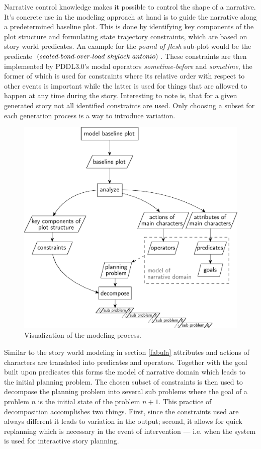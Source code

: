 Narrative control knowledge makes it possible to control the shape of a narrative. It's concrete use in the modeling approach at hand is to guide the narrative along a predetermined baseline plot. This is done by identifying key components of the plot structure and formulating state trajectory constraints, which are based on story world predicates. An example for the \emph{pound of flesh} sub-plot would be the predicate $(sealed\h bond\h over\h load\ shylock\ antonio)$. These constraints are then implemented by PDDL3.0's modal operators \emph{some\-time-before} and \emph{sometime}, the former of which is used for constraints where its relative order with respect to other events is important while the latter is used for things that are allowed to happen at any time during the story. Interesting to note is, that for a given generated story not all identified constraints are used. Only choosing a subset for each generation process is a way to introduce variation.
\begin{figure}[htbp]
 \centering
 \includegraphics[scale=0.6]{discourse_model}
 \caption{Visualization of the modeling process.}
 \label{fig:modproc}
\end{figure}

Similar to the story world modeling in section \ref{fabula} attributes and actions of characters are translated into predicates and operators. Together with the goal built upon predicates this forms the model of narrative domain which leads to the initial planning problem. The chosen subset of constraints is then used to decompose the planning problem into several sub problems where the goal of a problem $n$ is the initial state of the problem $n+1$. This practice of decomposition accomplishes two things. First, since the constraints used are always different it leads to variation in the output; second, it allows for quick replanning which is necessary in the event of intervention --- i.e. when the system is used for interactive story planning.

